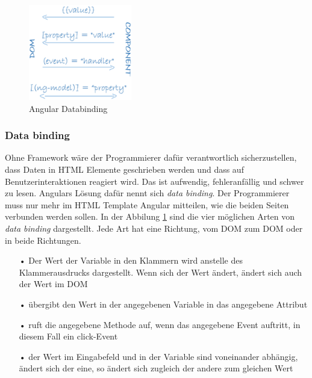 \mbox{}
\begin{figure}
\vspace{-50pt}
  \begin{center}
    \includegraphics[width=0.4\textwidth]{Bilder/Greistorfer/databinding}
  \end{center}
  \caption[Angular Databinding]{Angular Databinding\protect\footnotemark}
  \label{Angular Databinding}
  \vspace{0pt}
\end{figure}
\vspace{-40pt}


\subsubsection{Data binding}
\label{sec:ang-data-binding}
Ohne Framework wäre der Programmierer dafür verantwortlich sicherzustellen, dass Daten in \ac{HTML} Elemente geschrieben werden und dass auf Benutzerinteraktionen reagiert wird. Das ist aufwendig, fehleranfällig und schwer zu lesen. Angulars Lösung dafür nennt sich \textit{data binding}. Der Programmierer muss nur mehr im \ac{HTML} Template Angular mitteilen, wie die beiden Seiten verbunden werden sollen. In der Abbilung \ref{Angular Databinding} sind die vier möglichen Arten von \textit{data binding} dargestellt. Jede Art hat eine Richtung, vom \ac{DOM} zum \ac{DOM} oder in beide Richtungen.

\begin{itemize}
\item[•]  Der Wert der Variable in den Klammern wird anstelle des Klammerausdrucks dargestellt. Wenn sich der Wert ändert, ändert sich auch der Wert im \ac{DOM}
\item[•]  übergibt den Wert in der angegebenen Variable in das angegebene Attribut
\item[•]  ruft die angegebene Methode auf, wenn das angegebene Event auftritt, in diesem Fall ein click-Event
\item[•]  der Wert im Eingabefeld und in der Variable sind voneinander abhängig, ändert sich der eine, so ändert sich zugleich der andere zum gleichen Wert
\end{itemize}

